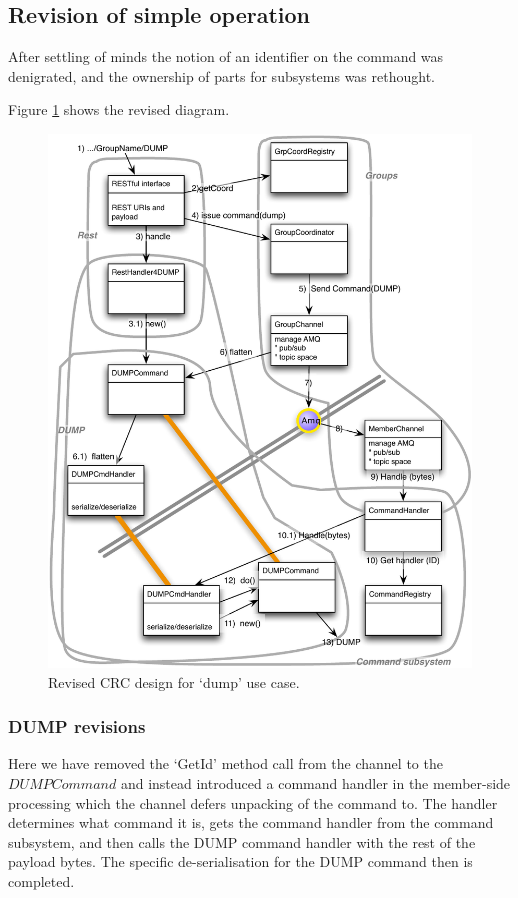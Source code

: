 \documentclass[a4paper,12pt]{article}
\begin{document}
\subsection{Revision of simple operation}
After settling of minds the notion of an identifier on the command was denigrated, and the ownership of parts for subsystems was rethought.

Figure \ref{fig:groupdesign002} shows the revised diagram.
\begin{figure}[h]
\centering
\includegraphics*[scale=0.55]{GroupDesign002.pdf}
\caption{Revised CRC design for `dump' use case.}
\label{fig:groupdesign002}
\end{figure}

\subsubsection*{DUMP revisions}
Here we have removed the `GetId' method call from the channel to the $DUMPCommand$ and instead introduced a command handler in the member-side processing which the channel defers unpacking of the command to. The handler determines what command it is, gets the command handler from the command subsystem, and then calls the DUMP command handler with the rest of the payload bytes. The specific de-serialisation for the DUMP command then is completed.
\end{document}
